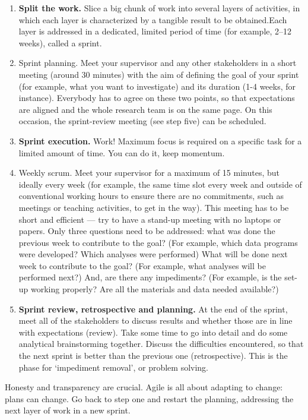 \documentclass[
]{book}
\begin{document}
\begin{enumerate}
\def\labelenumi{\arabic{enumi}.}
\item
  \textbf{Split the work.} Slice a big chunk of work into several layers
  of activities, in which each layer is characterized by a tangible
  result to be obtained.Each layer is addressed in a dedicated, limited
  period of time (for example, 2--12 weeks), called a sprint.
\item
  Sprint planning. Meet your supervisor and any other stakeholders in a
  short meeting (around 30 minutes) with the aim of defining the goal of
  your sprint (for example, what you want to investigate) and its
  duration (1-4 weeks, for instance). Everybody has to agree on these
  two points, so that expectations are aligned and the whole research
  team is on the same page. On this occasion, the sprint-review meeting
  (see step five) can be scheduled.
\item
  \textbf{Sprint execution.} Work! Maximum focus is required on a
  specific task for a limited amount of time. You can do it, keep
  momentum.
\item
  Weekly scrum. Meet your supervisor for a maximum of 15 minutes, but
  ideally every week (for example, the same time slot every week and
  outside of conventional working hours to ensure there are no
  commitments, such as meetings or teaching activities, to get in the
  way). This meeting has to be short and efficient --- try to have a
  stand-up meeting with no laptops or papers. Only three questions need
  to be addressed: what was done the previous week to contribute to the
  goal? (For example, which data programs were developed? Which analyses
  were performed) What will be done next week to contribute to the goal?
  (For example, what analyses will be performed next?) And, are there
  any impediments? (For example, is the set-up working properly? Are all
  the materials and data needed available?)
\item
  \textbf{Sprint review, retrospective and planning.} At the end of the
  sprint, meet all of the stakeholders to discuss results and whether
  those are in line with expectations (review). Take some time to go
  into detail and do some analytical brainstorming together. Discuss the
  difficulties encountered, so that the next sprint is better than the
  previous one (retrospective). This is the phase for `impediment
  removal', or problem solving.
\end{enumerate}

Honesty and transparency are crucial. Agile is all about adapting to
change: plans can change. Go back to step one and restart the planning,
addressing the next layer of work in a new sprint.
\end{document}
